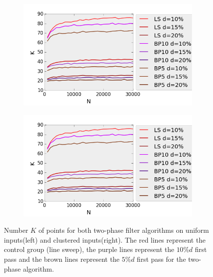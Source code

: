 \begin{figure}[H] 
  \begin{subfigure}[b]{0.5\linewidth}
    \centering
    \includegraphics[width=0.9\linewidth]{Pictures/unif_ls_bp_k} 
    \label{fig:unif_ls_bp_k} 
    \vspace{4ex}
  \end{subfigure}%
  \begin{subfigure}[b]{0.5\linewidth}
    \centering
    \includegraphics[width=0.9\linewidth]{Pictures/unif_ls_bp_k} 
    \label{fig:clus_ls_bp_k} 
    \vspace{4ex}
  \end{subfigure}
  \caption{Number $K$ of points for both two-phase filter algorithms on uniform inputs(left) and clustered inputs(right). The red lines represent the control group (line sweep), the purple lines represent the $10\%d$ first pass and the brown lines represent the $5\%d$ first pass for the two-phase algorithm.}
  \label{fig:ls_bp_k} 
\end{figure}

